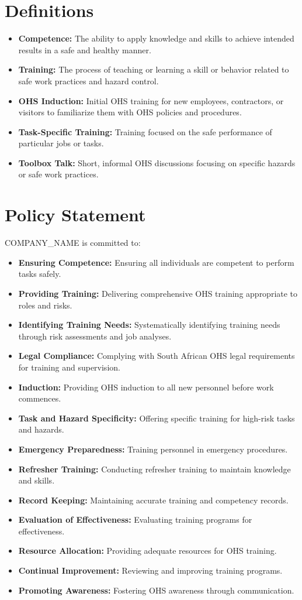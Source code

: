 \documentclass[12pt]{article}
\begin{document}
\section{Definitions}
\begin{itemize}
    \item \textbf{Competence:} The ability to apply knowledge and skills to achieve intended results in a safe and healthy manner.
    \item \textbf{Training:} The process of teaching or learning a skill or behavior related to safe work practices and hazard control.
    \item \textbf{OHS Induction:} Initial OHS training for new employees, contractors, or visitors to familiarize them with OHS policies and procedures.
    \item \textbf{Task-Specific Training:} Training focused on the safe performance of particular jobs or tasks.
    \item \textbf{Toolbox Talk:} Short, informal OHS discussions focusing on specific hazards or safe work practices.
\end{itemize}

\section{Policy Statement}
{{COMPANY_NAME}} is committed to:
\begin{itemize}
    \item \textbf{Ensuring Competence:} Ensuring all individuals are competent to perform tasks safely.
    \item \textbf{Providing Training:} Delivering comprehensive OHS training appropriate to roles and risks.
    \item \textbf{Identifying Training Needs:} Systematically identifying training needs through risk assessments and job analyses.
    \item \textbf{Legal Compliance:} Complying with South African OHS legal requirements for training and supervision.
    \item \textbf{Induction:} Providing OHS induction to all new personnel before work commences.
    \item \textbf{Task and Hazard Specificity:} Offering specific training for high-risk tasks and hazards.
    \item \textbf{Emergency Preparedness:} Training personnel in emergency procedures.
    \item \textbf{Refresher Training:} Conducting refresher training to maintain knowledge and skills.
    \item \textbf{Record Keeping:} Maintaining accurate training and competency records.
    \item \textbf{Evaluation of Effectiveness:} Evaluating training programs for effectiveness.
    \item \textbf{Resource Allocation:} Providing adequate resources for OHS training.
    \item \textbf{Continual Improvement:} Reviewing and improving training programs.
    \item \textbf{Promoting Awareness:} Fostering OHS awareness through communication.
\end{itemize}
\end{document}

